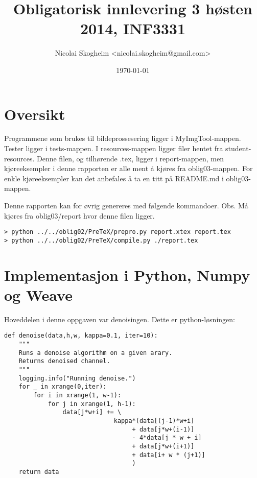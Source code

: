\documentclass{article}
\title{Obligatorisk innlevering 3 høsten 2014, INF3331}
\author{Nicolai Skogheim <nicolai.skogheim@gmail.com>}
\date{\today}
\renewenvironment{shadedwbar}{
\def\FrameCommand{\color[rgb]{0.7,     0.95686, 1}\vrule width 1mm\normalcolor\colorbox{shadecolor}}\FrameRule0.6pt
\MakeFramed {\advance\hsize-2mm\FrameRestore}\vskip3mm}{\vskip0mm\endMakeFramed}
\renewenvironment{shadedquoteBlueBar}[1][]{
\bgroup\rmfamily
\fboxsep=0mm\relax
\begin{shadedwbar}
\list{}{\parsep=-2mm\parskip=0mm\topsep=0pt\leftmargin=2mm
\rightmargin=2\leftmargin\leftmargin=4pt\relax}
\item\relax}
{\endlist\end{shadedwbar}\egroup}
\begin{document}
\maketitle

\tableofcontents

\section*{Oversikt}
Programmene som brukes til bildeprossesering ligger i MyImgTool-mappen.
Tester ligger i tests-mappen.
I resources-mappen ligger filer hentet fra student-resources.
\linebreak
Denne filen, og tilhørende .tex, ligger i report-mappen,
men kjøreeksempler i denne rapporten er alle ment å kjøres
fra oblig03-mappen.
For enkle kjøreeksempler kan det anbefales å ta en titt på README.md
i oblig03-mappen.

Denne rapporten kan for øvrig genereres med følgende kommandoer.
Obs. Må kjøres fra oblig03/report hvor denne filen ligger.
\begin{Verbatim}[numbers=none,frame=lines,label=\fbox{{\tiny Terminal}},fontsize=\fontsize{9pt}{9pt},
labelposition=topline,framesep=2.5mm,framerule=0.7pt]
> python ../../oblig02/PreTeX/prepro.py report.xtex report.tex
> python ../../oblig02/PreTeX/compile.py ./report.tex
\end{Verbatim}
\noindent


\section{Implementasjon i Python, Numpy og Weave}
Hoveddelen i denne oppgaven var denoisingen.
Dette er python-løsningen:

\begin{shadedquoteBlueBar}
\fontsize{9pt}{9pt}
\begin{Verbatim}
def denoise(data,h,w, kappa=0.1, iter=10):
    """
    Runs a denoise algorithm on a given arary.
    Returns denoised channel.
    """
    logging.info("Running denoise.")
    for _ in xrange(0,iter):
        for i in xrange(1, w-1):
            for j in xrange(1, h-1):
                data[j*w+i] += \
                              kappa*(data[(j-1)*w+i]
                                   + data[j*w+(i-1)]
                                   - 4*data[j * w + i]
                                   + data[j*w+(i+1)]
                                   + data[i+ w * (j+1)]
                                   )
    return data
\end{Verbatim}
\end{shadedquoteBlueBar}
\noindent
\end{document}
